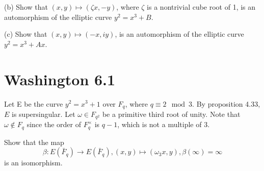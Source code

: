 \documentclass{article}
\begin{document}
(b) Show that $(x,y) \mapsto (\zeta x,−y)$, where $\zeta$ is a nontrivial cube root of 1, is an automorphism of the elliptic curve $y^2 = x^3 + B$.

(c) Show that $(x, y) \mapsto (−x, iy)$, is an automorphism of the elliptic curve $y^2 = x^3 + Ax$.

\section{Washington 6.1}
Let E be the curve $y^2 = x^3+1$ over $F_q$, where $q \equiv 2 \mod 3$. By proposition 4.33, $E$ is supersingular. Let $\omega \in F_{q^2}$ be a primitive third root of unity. Note that $\omega \not \in F_q$ since the order of $F_q^\times$ is $q−1$, which is not a multiple of $3$.

Show that the map
$$\beta: E(\bar F_q) \to E(\bar F_q), (x,y) \mapsto (\omega_3 x, y), \beta(\infty) = \infty$$
is an isomorphism.
\end{document}
